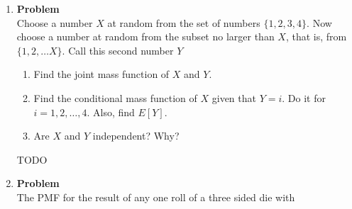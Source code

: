 \documentclass[12pt]{article}
\newenvironment{Ex}{\textbf{Problem}\vspace{.75em}\\}{}
\begin{document}
\begin{enumerate}
\begin{Ex}
      The joint probability mass function of the random variables
      $X$, $Y$, $Z$ is
      \begin{equation*}
        \label{eq:4-question}
        \begin{aligned}
          p_{X,Y,Z}(0,0,0) = \frac{1}{9}, && p_{X,Y,Z}(0,0,1) =
          \frac{1}{9}, && p_{X,Y,Z}(0,1,0) = \frac{1}{18}, &&
          p_{X,Y,Z}(0,1,1) = \frac{2}{9} \\
          p_{X,Y,Z}(1,0,0) = \frac{1}{9}, && p_{X,Y,Z}(1,0,1) =
          \frac{1}{18}, && p_{X,Y,Z}(1,1,0) = \frac{1}{9}, &&
          p_{X,Y,Z}(1,1,1) = \frac{1}{9} \\
        \end{aligned}
      \end{equation*}
      \begin{enumerate}
      \item Find $E[XY\sqrt{Z}]$.
      \item Argue that $E[XY +XZ2 +YZ] = E[XY]+E[XZ2]+E[YZ]$ and then
        compute its value.
      \item Are $X$, $Y$ independent given $Z=1$? Compute $E[XY|Z = 1]$.
      \end{enumerate}
      \begin{solution}
        {\huge TODO}
      \end{solution}
    \end{Ex}
  \item
    \begin{Ex}
      Choose a number $X$ at random from the set of numbers $\{1, 2,
      3, 4\}$. Now choose a number at random from the subset no larger
      than $X$, that is, from $\{1,2,\ldots X\}$. Call this second
      number $Y$
      \begin{enumerate}
      \item Find the joint mass function of $X$ and $Y$.
      \item Find the conditional mass function of $X$ given that $Y =
        i$. Do it for $i = 1,2,\ldots ,4$. Also, find $E[Y]$.
      \item Are $X$ and $Y$ independent? Why?
      \end{enumerate}
      \begin{solution}
        {\huge TODO}
      \end{solution}
    \end{Ex}
  \item 
    \begin{Ex}
      The PMF for the result of any one roll of a three sided die with

\end{Ex}
\end{enumerate}
\end{document}
